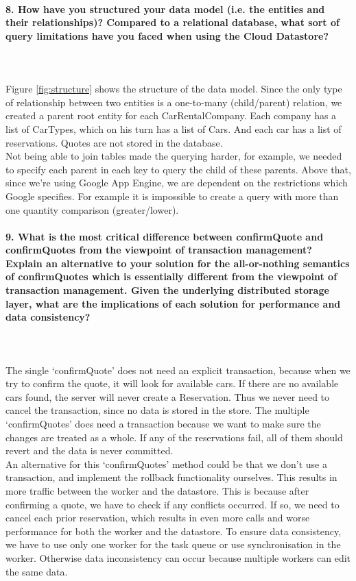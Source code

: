 \documentclass{ds-report}
\begin{document}
	\paragraph{8. How have you structured your data model (i.e. the entities and their relationships)? Compared to a relational database, what sort of query limitations have you faced when using the Cloud Datastore?} \mbox{}\\\\
	Figure \ref{fig:structure} shows the structure of the data model. Since the only type of relationship between two entities is a one-to-many (child/parent) relation, we created a parent root entity for each CarRentalCompany. Each company has a list of CarTypes, which on his turn has a list of Cars. And each car has a list of reservations. Quotes are not stored in the database.\\
Not being able to join tables made the querying harder, for example, we needed to specify each parent in each key to query the child of these parents. Above that, since we're using Google App Engine, we are dependent on the restrictions which Google specifies. For example it is impossible to create a query with more than one quantity comparison (greater/lower). 
	


	\paragraph{9. What is the most critical difference between confirmQuote and confirmQuotes from the viewpoint of transaction management? Explain an alternative to your solution for the all-or-nothing semantics of confirmQuotes which is essentially different from the viewpoint of transaction management. Given the underlying distributed storage layer, what are the implications of each solution for performance and data consistency?} \mbox{}\\\\	
The single `confirmQuote' does not need an explicit transaction, because when we try to confirm the quote, it will look for available cars. If there are no available cars found, the server will never create a Reservation. Thus we never need to cancel the transaction, since no data is stored in the store.
The multiple `confirmQuotes' does need a transaction because we want to make sure the changes are treated as a whole. If any of the reservations fail, all of them should revert and the data is never committed. \\
\clearpage
An alternative for this `confirmQuotes' method could be that we don't use a transaction, and implement the rollback functionality ourselves. This results in more traffic between the worker and the datastore. This is because after confirming a quote, we have to check if any conflicts occurred. If so, we need to cancel each prior reservation, which results in even more calls and worse performance for both the worker and the datastore. To ensure data consistency, we have to use only one worker for the task queue or use synchronisation in the worker. Otherwise data inconsistency can occur because multiple workers can edit the same data.\\
\end{document}
